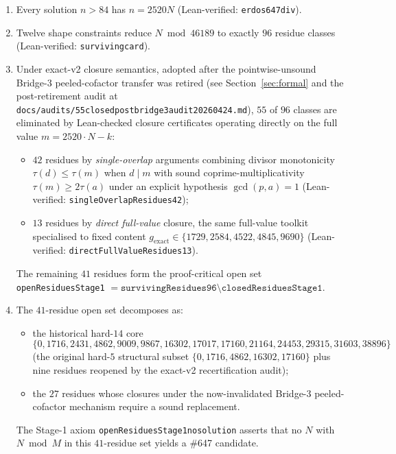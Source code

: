 \documentclass[11pt]{article}
\renewcommand{\_}{\origunderscore\allowbreak}
\theoremstyle{definition}
\theoremstyle{remark}
\begin{document}
\begin{enumerate}
\item[\textbf{(R1)}] Every solution $n>84$ has $n=2520N$
  (Lean-verified: \texttt{erdos647\_div\_2520}).
\item[\textbf{(R2)}] Twelve shape constraints reduce
  $N\bmod{46189}$ to exactly $96$ residue classes
  (Lean-verified: \texttt{surviving\_card}).
\item[\textbf{(R3)}] Under exact-v2 closure semantics, adopted after
  the pointwise-unsound Bridge-3 peeled-cofactor transfer was retired
  (see Section~\ref{sec:formal} and the post-retirement audit at
  \texttt{docs/audits/55\_closed\_post\_bridge3\_audit\_20260424.md}),
  $55$ of $96$ classes are eliminated by Lean-checked closure
  certificates operating directly on the full value
  $m=2520\cdot N-k$:
  \begin{itemize}
  \item $42$ residues by \emph{single-overlap} arguments combining
    divisor monotonicity $\tau(d)\le\tau(m)$ when $d\mid m$ with
    sound coprime-multiplicativity $\tau(m)\ge 2\tau(a)$ under an
    explicit hypothesis $\gcd(p,a)=1$ (Lean-verified:
    \texttt{singleOverlapResidues42});
  \item $13$ residues by \emph{direct full-value} closure, the same
    full-value toolkit specialised to fixed content
    $g_{\mathrm{exact}}\in\{1729, 2584, 4522, 4845, 9690\}$
    (Lean-verified: \texttt{directFullValueResidues13}).
  \end{itemize}
  The remaining $41$ residues form the proof-critical open set
  \texttt{openResiduesStage1} $= \texttt{survivingResidues96}
  \setminus\texttt{closedResiduesStage1}$.
\item[\textbf{(R4)}] The $41$-residue open set decomposes as:
  \begin{itemize}
  \item the historical hard-$14$ core
    \[
      \{0,1716,2431,4862,9009,9867,16302,17017,17160,
        21164,24453,29315,31603,38896\}
    \]
    (the original hard-$5$ structural subset
    $\{0,1716,4862,16302,17160\}$ plus nine residues reopened by the
    exact-v2 recertification audit);
  \item the $27$ residues whose closures under the now-invalidated
    Bridge-3 peeled-cofactor mechanism require a sound replacement.
  \end{itemize}
  The Stage-1 axiom \texttt{openResiduesStage1\_no\_solution}
  asserts that no $N$ with $N\bmod M$ in this $41$-residue set
  yields a \#647 candidate.
\end{enumerate}
\end{document}
